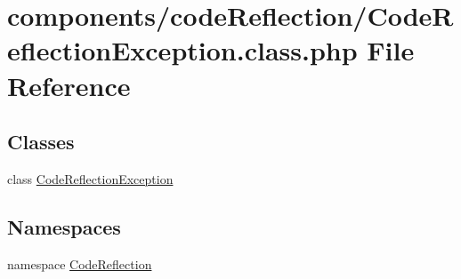 \hypertarget{_code_reflection_exception_8class_8php}{
\section{components/codeReflection/CodeReflectionException.class.php File Reference}
\label{_code_reflection_exception_8class_8php}
}
\subsection*{Classes}
\begin{CompactItemize}
\item 
class \hyperlink{class_code_reflection_exception}{CodeReflectionException}
\end{CompactItemize}
\subsection*{Namespaces}
\begin{CompactItemize}
\item 
namespace \hyperlink{namespace_code_reflection}{CodeReflection}
\end{CompactItemize}
